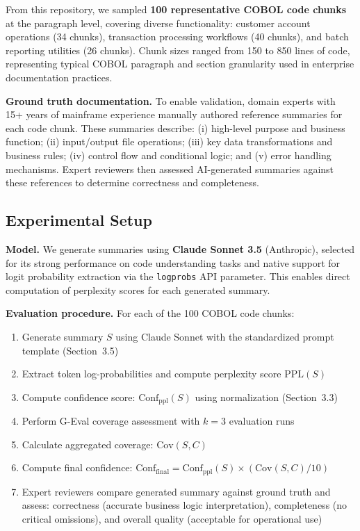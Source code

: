 From this repository, we sampled \textbf{100 representative COBOL code chunks} at the
paragraph level, covering diverse functionality: customer account operations (34 chunks),
transaction processing workflows (40 chunks), and batch reporting utilities (26 chunks).
Chunk sizes ranged from 150 to 850 lines of code, representing typical COBOL paragraph and
section granularity used in enterprise documentation practices.

\textbf{Ground truth documentation.} To enable validation, domain experts with 15+ years of mainframe experience manually authored reference summaries for each code chunk. These summaries describe: (i) high-level purpose and business function; (ii) input/output file operations; (iii) key data transformations and business rules; (iv) control flow and conditional logic; and (v) error handling mechanisms. Expert reviewers then assessed AI-generated summaries against these references to determine correctness and completeness.

\subsection{Experimental Setup}

\textbf{Model.} We generate summaries using \textbf{Claude Sonnet 3.5} (Anthropic), selected for its strong performance on code understanding tasks and native support for logit probability extraction via the \texttt{logprobs} API parameter. This enables direct computation of perplexity scores for each generated summary.

\textbf{Evaluation procedure.} For each of the 100 COBOL code chunks:
\begin{enumerate}
    \item Generate summary $S$ using Claude Sonnet with the standardized prompt template (Section~3.5)
    \item Extract token log-probabilities and compute perplexity score $\text{PPL}(S)$
    \item Compute confidence score: $\text{Conf}_{\text{ppl}}(S)$ using normalization (Section~3.3)
    \item Perform G-Eval coverage assessment with $k=3$ evaluation runs
    \item Calculate aggregated coverage: $\text{Cov}(S, C)$
    \item Compute final confidence: $\text{Conf}_{\text{final}} = \text{Conf}_{\text{ppl}}(S) \times (\text{Cov}(S,C)/10)$
    \item Expert reviewers compare generated summary against ground truth and assess: correctness (accurate business logic interpretation), completeness (no critical omissions), and overall quality (acceptable for operational use)
\end{enumerate}

